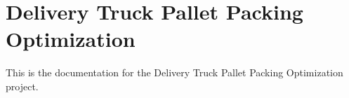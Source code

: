 \chapter{Delivery Truck Pallet Packing Optimization}
\hypertarget{index}{}\label{index}
This is the documentation for the Delivery Truck Pallet Packing Optimization project. 